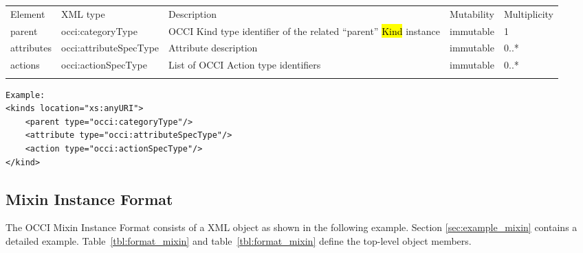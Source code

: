 \documentclass[10pt,a4paper]{article}
\begin{document}
 {
    \begin{tabularx}{\textwidth}{llXll}
    \toprule
    Element & XML type & Description & Mutability & Multiplicity \\
    \colrule
    parent & occi:categoryType & OCCI Kind type identifier of the
related ``parent'' \hl{Kind} instance & immutable & 1 \\

    attributes & occi:attributeSpecType & Attribute description & immutable & 0..* \\

    actions & occi:actionSpecType & List of OCCI Action type
identifiers & immutable & 0..* \\
    \botrule
    \end{tabularx}
}
\FloatBarrier

\begin{lstlisting}
Example:
<kinds location="xs:anyURI">
	<parent type="occi:categoryType"/>
	<attribute type="occi:attributeSpecType"/>
	<action type="occi:actionSpecType"/>
</kind>
\end{lstlisting}

\subsection{Mixin Instance Format}
\label{sec:format_mixin}

The OCCI Mixin Instance Format consists of a XML object as shown in the following example. Section \ref{sec:example_mixin} contains a detailed example.
Table~\ref{tbl:format_mixin} and table~\ref{tbl:format_mixin} define the top-level object members.
 
\end{document}

